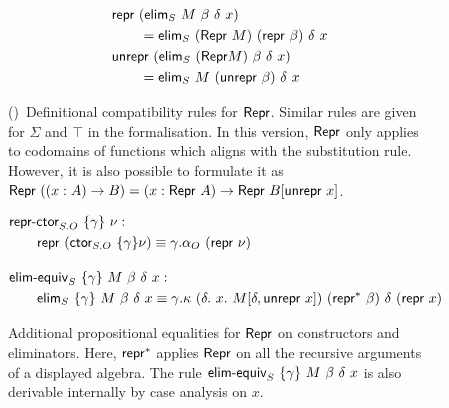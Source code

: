 \begin{figure}[H]
\begin{minipage}[t]{0.5\textwidth}
\begin{align*}
  & \textsf{repr}\ (\textsf{elim}_S\ M\ \beta\ \delta\ x) \\ &\qquad = \textsf{elim}_S\ (\textsf{Repr}\ M)\ (\textsf{repr}\ \beta)\ \delta\ x \\
  & \textsf{unrepr}\ (\textsf{elim}_S\ (\textsf{Repr} M)\ \beta\ \delta\ x)\\ &\qquad = \textsf{elim}_S\ M\ (\textsf{unrepr}\ \beta)\ \delta\ x
  \end{align*}
  \end{minipage}%
  \caption{()\
  Definitional compatibility rules for $\textsf{Repr}$. Similar rules are given for
  $\Sigma$ and $\top$ in the formalisation. In this version, $\textsf{Repr}$ only applies to codomains
  of functions which aligns with the substitution rule. However, it is also
  possible to formulate it as \\ $\textsf{Repr}\ ((x : A) \to B) = (x : \textsf{Repr}\ A) \to \textsf{Repr}\ B[\textsf{unrepr}\ x]$.}
  \label{fig:lambdaind-repr-coherence-pi-univ}
\end{figure}

\begin{figure}[H]
  \begin{align*}
  & \mta{repr-ctor}_{S.O}\ \{\gamma\}\ \nu : \\ & \qquad \Mrepr\ (\Mctor_{S.O}\ \{\gamma\} \nu) \equiv \gamma.\alpha_O\ (\Mrepr\ \nu) \\[1em]
  & \mta{elim-equiv}_{S}\ \{\gamma\}\ M\ \beta\ \delta\ x :  \\ & \qquad
  \mta{elim}_{S}\ \{\gamma\}\ M\ \beta\ \delta\ x \equiv \gamma.\kappa\ (\delta.\ x.\ M[\delta, \Munrepr\ x])\ (\Mrepr^*\ \beta)\ \delta\ (\Mrepr\ x)
  \end{align*}
  \caption{Additional propositional equalities for $\textsf{Repr}$ on constructors and eliminators. Here, $\textsf{repr}^*$ applies $\textsf{Repr}$ on all the recursive
    arguments of a displayed algebra. The rule $\mta{elim-equiv}_{S}\ \{\gamma\}\ M\ \beta\ \delta\ x$ is also derivable internally by case analysis
    on $x$.}
\end{figure}
